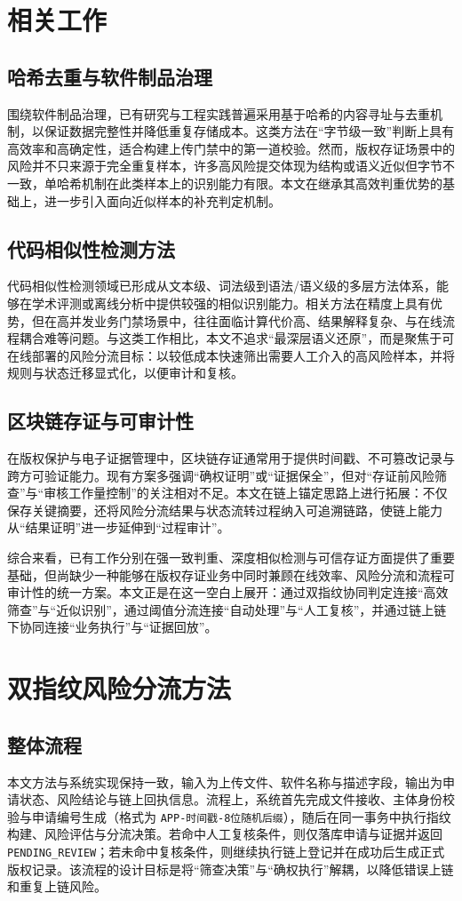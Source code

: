 \documentclass[UTF8,a4paper,zihao=5]{ctexart}
\begin{document}
\section{相关工作}
\subsection{哈希去重与软件制品治理}
围绕软件制品治理，已有研究与工程实践普遍采用基于哈希的内容寻址与去重机制，以保证数据完整性并降低重复存储成本\cite{r1}。这类方法在“字节级一致”判断上具有高效率和高确定性，适合构建上传门禁中的第一道校验。然而，版权存证场景中的风险并不只来源于完全重复样本，许多高风险提交体现为结构或语义近似但字节不一致，单哈希机制在此类样本上的识别能力有限。本文在继承其高效判重优势的基础上，进一步引入面向近似样本的补充判定机制。

\subsection{代码相似性检测方法}
代码相似性检测领域已形成从文本级、词法级到语法/语义级的多层方法体系\cite{r2,r3}，能够在学术评测或离线分析中提供较强的相似识别能力。相关方法在精度上具有优势，但在高并发业务门禁场景中，往往面临计算代价高、结果解释复杂、与在线流程耦合难等问题。与这类工作相比，本文不追求“最深层语义还原”，而是聚焦于可在线部署的风险分流目标：以较低成本快速筛出需要人工介入的高风险样本，并将规则与状态迁移显式化，以便审计和复核。

\subsection{区块链存证与可审计性}
在版权保护与电子证据管理中，区块链存证通常用于提供时间戳、不可篡改记录与跨方可验证能力\cite{r4,r5}。现有方案多强调“确权证明”或“证据保全”，但对“存证前风险筛查”与“审核工作量控制”的关注相对不足。本文在链上锚定思路上进行拓展：不仅保存关键摘要，还将风险分流结果与状态流转过程纳入可追溯链路，使链上能力从“结果证明”进一步延伸到“过程审计”。

综合来看，已有工作分别在强一致判重、深度相似检测与可信存证方面提供了重要基础，但尚缺少一种能够在版权存证业务中同时兼顾在线效率、风险分流和流程可审计性的统一方案。本文正是在这一空白上展开：通过双指纹协同判定连接“高效筛查”与“近似识别”，通过阈值分流连接“自动处理”与“人工复核”，并通过链上链下协同连接“业务执行”与“证据回放”。

\section{双指纹风险分流方法}
\subsection{整体流程}
本文方法与系统实现保持一致，输入为上传文件、软件名称与描述字段，输出为申请状态、风险结论与链上回执信息。流程上，系统首先完成文件接收、主体身份校验与申请编号生成（格式为 \texttt{APP-时间戳-8位随机后缀}），随后在同一事务中执行指纹构建、风险评估与分流决策。若命中人工复核条件，则仅落库申请与证据并返回 \texttt{PENDING\_REVIEW}；若未命中复核条件，则继续执行链上登记并在成功后生成正式版权记录。该流程的设计目标是将“筛查决策”与“确权执行”解耦，以降低错误上链和重复上链风险。
\end{document}
